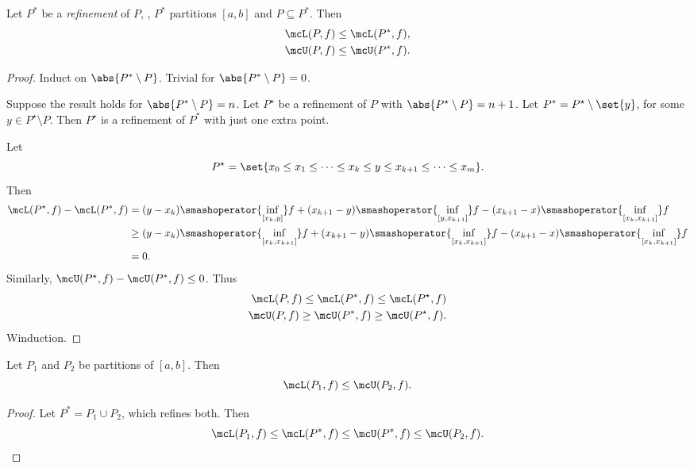 \begin{lemma} \label{thm:refinement}
    Let $P^*$ be a \emph{refinement} of $P$, \ie,
    $P^*$ partitions $[a, b]$ and $P \subseteq P^*$. Then \begin{align*}
        \mcL(P, f) &\le \mcL(P^*, f), \\
        \mcU(P, f) &\le \mcU(P^*, f).
    \end{align*}
\end{lemma}
\begin{proof}
    Induct on $\abs{P^* \setminus P}$.
    Trivial for $\abs{P^* \setminus P} = 0$.

    Suppose the result holds for $\abs{P^* \setminus P} = n$.
    Let $P^\star$ be a refinement of $P$ with
    $\abs{P^\star \setminus P} = n + 1$.
    Let $P^* = P^\star \setminus \set{y}$,
    for some $y \in P^\star \setminus P$.
    Then $P^\star$ is a refinement of $P^*$ with just one extra point.

    Let \[
        P^\star = \set{x_0 \le x_1 \le \dots
            \le x_k \le y \le x_{k+1} \le
            \dots \le x_m}.
    \] Then \begin{align*}
        \mcL(P^\star, f) - \mcL(P^*, f)
            &= (y - x_k) \smashoperator{\inf_{[x_k, y]}} f
                + (x_{k+1} - y) \smashoperator{\inf_{[y, x_{k+1}]}} f
                - (x_{k+1} - x) \smashoperator{\inf_{[x_k, x_{k+1}]}} f \\
            &\ge (y - x_k) \smashoperator{\inf_{[x_k, x_{k+1}]}} f
                + (x_{k+1} - y) \smashoperator{\inf_{[x_k, x_{k+1}]}} f
                - (x_{k+1} - x) \smashoperator{\inf_{[x_k, x_{k+1}]}} f \\
            &= 0.
    \end{align*}
    Similarly, $\mcU(P^\star, f) - \mcU(P^*, f) \le 0$.
    Thus \begin{align*}
        \mcL(P, f) \le \mcL(P^*, f) \le \mcL(P^\star, f) \\
        \mcU(P, f) \ge \mcU(P^*, f) \ge \mcU(P^\star, f).
    \end{align*}
    Winduction.
\end{proof}

\begin{lemma*}
    Let $P_1$ and $P_2$ be partitions of $[a, b]$.
    Then \[
        \mcL(P_1, f) \le \mcU(P_2, f).
    \]
\end{lemma*}
\begin{proof}
    Let $P^* = P_1 \cup P_2$, which refines both.
    Then \[
        \mcL(P_1, f) \le \mcL(P^*, f) \le \mcU(P^*, f) \le \mcU(P_2, f).
        \qedhere
    \]
\end{proof}

